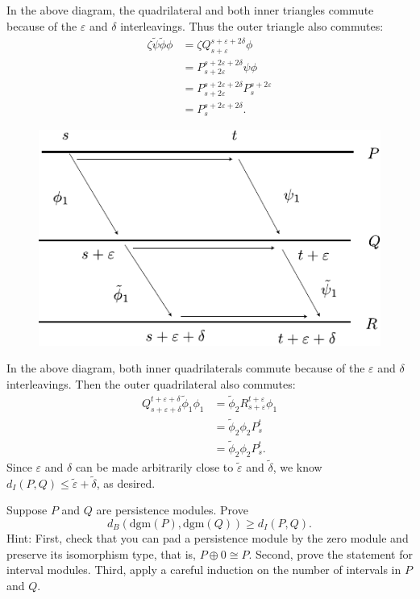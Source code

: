 \documentclass[twoside,10pt]{article}
\newcommand{\dgm}{\text{dgm}}
\begin{document}
In the above diagram, the quadrilateral and both inner triangles commute because of the $\varepsilon$ and $\delta$ interleavings. Thus the outer triangle also commutes:
\begin{align*}
	\zeta \tilde{\psi} \tilde{\phi} \phi &= \zeta Q_{s+\varepsilon}^{s+\varepsilon+2\delta}\phi \\
					     &= P_{s+2\varepsilon}^{s+2\varepsilon+2\delta}\psi \phi \\
					     &= P_{s+2\varepsilon}^{s+2\varepsilon+2\delta}P_{s}^{s+2\varepsilon} \\
					     &= P_{s}^{s+2\varepsilon+2\delta}.
\end{align*}

\begin{figure}[H]
	\centering
	\includegraphics[scale=1]{fig/1d.pdf}
\end{figure}

In the above diagram, both inner quadrilaterals commute because of the $\varepsilon$ and $\delta$ interleavings. Then the outer quadrilateral also commutes:
\begin{align*}
	Q_{s+\varepsilon+\delta}^{t+\varepsilon+\delta} \tilde{\phi}_1 \phi_1 &= \tilde{\phi}_2 R_{s+\varepsilon}^{t+\varepsilon} \phi_1 \\
									      &= \tilde{\phi}_2 \phi_2 P_{s}^{t} \\
									      &= \tilde{\phi}_2 \phi_2 P_{s}^{t}.
\end{align*}
Since $\varepsilon$ and $\delta$ can be made arbitrarily close to $\tilde{\varepsilon}$ and $\tilde{\delta}$, we know $d_{I}(P,Q) \leq \tilde{\varepsilon}+\tilde{\delta}$, as desired.


\newpage

\begin{exer}
	Suppose $P$ and $Q$ are persistence modules. Prove
	\[
	d_B(\dgm(P), \dgm(Q)) \geq d_I(P, Q).
	\]
	Hint: First, check that you can  pad a persistence module by the zero module and preserve its isomorphism type, that is, $P \oplus 0 \cong P$. Second, prove the statement for interval modules. Third, apply a careful induction on the number of intervals in $P$ and $Q$.
\end{exer}
\end{document}
